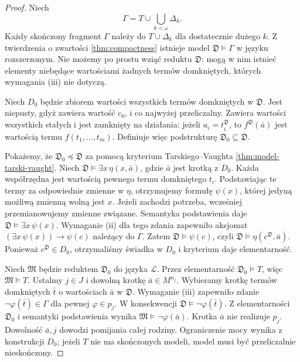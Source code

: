 \begin{proof}
Niech
\[
\Gamma=T\cup\bigcup_{k<\omega}\Delta_k.
\]
Każdy skończony fragment $\Gamma$ należy do
$T\cup\Delta_k$ dla dostatecznie dużego $k$.
Z twierdzenia o zwartości \ref{thm:compactness}
istnieje model $\mathfrak D\models\Gamma$
w języku rozszerzonym. Nie możemy po prostu
wziąć reduktu $\mathfrak D$: mogą w nim istnieć
elementy niebędące wartościami żadnych termów
domkniętych, których wymagania (iii) nie dotyczą.

Niech $D_0$ będzie zbiorem wartości wszystkich
termów domkniętych w $\mathfrak D$.
Jest niepusty, gdyż zawiera wartość $c_0$,
i co najwyżej przeliczalny. Zawiera wartości
wszystkich stałych i jest zamknięty na działania:
jeżeli $a_i=t_i^{\mathfrak D}$, to
$f^{\mathfrak D}(\bar a)$ jest wartością termu
$f(t_1,\ldots,t_m)$. Definiuje więc podstrukturę
$\mathfrak D_0\subseteq\mathfrak D$.

Pokażemy, że $\mathfrak D_0\preccurlyeq\mathfrak D$
za pomocą kryterium Tarskiego--Vaughta
\ref{thm:model-tarski-vaught}.
Niech $\mathfrak D\models\exists x\,\eta(x,\bar a)$,
gdzie $\bar a$ jest krotką z $D_0$. Każda współrzędna
jest wartością pewnego termu domkniętego $t_i$.
Podstawiając te termy za odpowiednie zmienne
w $\eta$, otrzymujemy formułę $\psi(x)$, której
jedyną możliwą zmienną wolną jest $x$.
Jeżeli zachodzi potrzeba, wcześniej przemianowujemy
zmienne związane. Semantyka podstawienia daje
$\mathfrak D\models\exists x\,\psi(x)$.
Wymaganie (ii) dla tego zdania zapewniło
aksjomat $(\exists x\,\psi(x))\to\psi(c)$
należący do $\Gamma$. Zatem
$\mathfrak D\models\psi(c)$, czyli
$\mathfrak D\models\eta(c^{\mathfrak D},\bar a)$.
Ponieważ $c^{\mathfrak D}\in D_0$, otrzymaliśmy
świadka w $D_0$ i kryterium daje elementarność.

Niech $\mathfrak M$ będzie reduktem $\mathfrak D_0$
do języka $\mathcal L$. Przez elementarność
$\mathfrak D_0\models T$, więc $\mathfrak M\models T$.
Ustalmy $j\in J$ i dowolną krotkę $\bar a\in M^{n_j}$.
Wybieramy krotkę termów domkniętych $\bar t$
o wartościach $\bar a$ w $\mathfrak D$.
Wymaganie (iii) zapewniło zdanie
$\neg\varphi(\bar t)\in\Gamma$
dla pewnej $\varphi\in p_j$. W konsekwencji
$\mathfrak D\models\neg\varphi(\bar t)$.
Z elementarności $\mathfrak D_0$ i semantyki
podstawienia wynika $\mathfrak M\models\neg\varphi(\bar a)$.
Krotka $\bar a$ nie realizuje $p_j$.
Dowolność $\bar a,j$ dowodzi pomijania całej
rodziny. Ograniczenie mocy wynika z konstrukcji $D_0$;
jeżeli $T$ nie ma skończonych modeli, model
musi być przeliczalnie nieskończony.
\end{proof}

